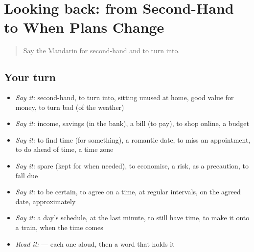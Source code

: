 \section[(dialogue)]{Looking back: from Second-Hand to When Plans Change}

\label{lesson:ZH-R391-review-386-391}



\begin{quote}
Say the Mandarin for second-hand and to turn into.
\end{quote}

\subsection*{Your turn}
\begin{itemize}
\raggedright
  \item \emph{Say it:} second-hand, to turn into, sitting unused at home, good value for money, to turn bad (of the weather)
  \item \emph{Say it:} income, savings (in the bank), a bill (to pay), to shop online, a budget
  \item \emph{Say it:} to find time (for something), a romantic date, to miss an appointment, to do ahead of time, a time zone
  \item \emph{Say it:} spare (kept for when needed), to economise, a risk, as a precaution, to fall due
  \item \emph{Say it:} to be certain, to agree on a time, at regular intervals, on the agreed date, approximately
  \item \emph{Say it:} a day's schedule, at the last minute, to still have time, to make it onto a train, when the time comes
  \item \emph{Read it:}    — each one aloud, then a word that holds it
\end{itemize}

